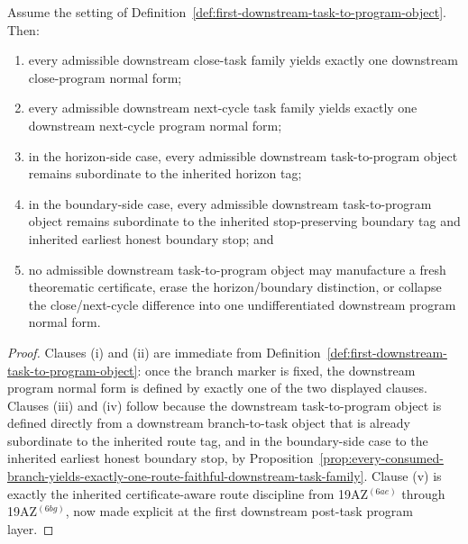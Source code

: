 \begin{proposition}
\label{prop:every-downstream-task-family-yields-exactly-one-compact-downstream-program-normal-form}
Assume the setting of Definition~\ref{def:first-downstream-task-to-program-object}. Then:
\begin{enumerate}[label=(\roman*)]
 \item every admissible downstream close-task family yields exactly one downstream close-program normal form;
 \item every admissible downstream next-cycle task family yields exactly one downstream next-cycle program normal form;
 \item in the horizon-side case, every admissible downstream task-to-program object remains subordinate to the inherited horizon tag;
 \item in the boundary-side case, every admissible downstream task-to-program object remains subordinate to the inherited stop-preserving boundary tag and inherited earliest honest boundary stop; and
 \item no admissible downstream task-to-program object may manufacture a fresh theorematic certificate, erase the horizon/boundary distinction, or collapse the close/next-cycle difference into one undifferentiated downstream program normal form.
\end{enumerate}
\end{proposition}

\begin{proof}
Clauses (i) and (ii) are immediate from Definition~\ref{def:first-downstream-task-to-program-object}: once the branch marker is fixed, the downstream program normal form is defined by exactly one of the two displayed clauses. Clauses (iii) and (iv) follow because the downstream task-to-program object is defined directly from a downstream branch-to-task object that is already subordinate to the inherited route tag, and in the boundary-side case to the inherited earliest honest boundary stop, by Proposition~\ref{prop:every-consumed-branch-yields-exactly-one-route-faithful-downstream-task-family}. Clause (v) is exactly the inherited certificate-aware route discipline from 19AZ$^{(6ae)}$ through 19AZ$^{(6bg)}$, now made explicit at the first downstream post-task program layer.
\end{proof}

